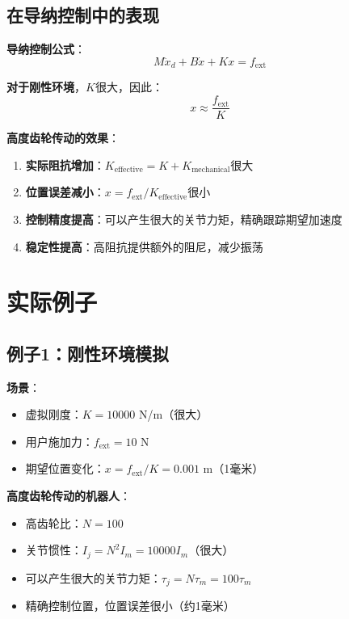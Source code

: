 \documentclass[12pt,a4paper]{article}
\begin{document}
\subsection{在导纳控制中的表现}

\textbf{导纳控制公式}：
\begin{equation}
M\ddot{x}_d + B\dot{x} + Kx = f_{\text{ext}}
\end{equation}

\textbf{对于刚性环境}，$K$很大，因此：
\begin{equation}
x \approx \frac{f_{\text{ext}}}{K}
\end{equation}

\textbf{高度齿轮传动的效果}：
\begin{enumerate}
\item \textbf{实际阻抗增加}：$K_{\text{effective}} = K + K_{\text{mechanical}}$很大
\item \textbf{位置误差减小}：$x = f_{\text{ext}}/K_{\text{effective}}$很小
\item \textbf{控制精度提高}：可以产生很大的关节力矩，精确跟踪期望加速度
\item \textbf{稳定性提高}：高阻抗提供额外的阻尼，减少振荡
\end{enumerate}

\section{实际例子}

\subsection{例子1：刚性环境模拟}

\textbf{场景}：
\begin{itemize}
\item 虚拟刚度：$K = 10000$ N/m（很大）
\item 用户施加力：$f_{\text{ext}} = 10$ N
\item 期望位置变化：$x = f_{\text{ext}}/K = 0.001$ m（1毫米）
\end{itemize}

\textbf{高度齿轮传动的机器人}：
\begin{itemize}
\item 高齿轮比：$N = 100$
\item 关节惯性：$I_j = N^2 I_m = 10000 I_m$（很大）
\item 可以产生很大的关节力矩：$\tau_j = N\tau_m = 100\tau_m$
\item 精确控制位置，位置误差很小（约1毫米）
\end{itemize}
\end{document}

